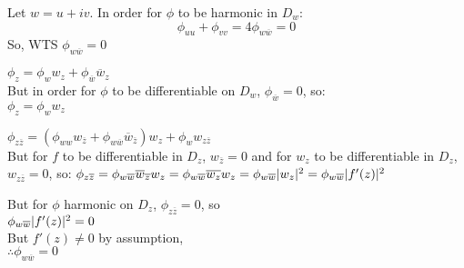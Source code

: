 \documentclass[letterpaper,12pt,fleqn]{article}
\newcommand{\p}{\phi}
\newcommand{\conj}[1]{\overline{#1}}
\newcommand{\wb}{\conj{w}}
\newcommand{\zb}{\conj{z}}
\begin{document}
\begin{theproof}
  Let $w=u+iv$. In order for $\p$ to be harmonic in $D_w$:
  \[\p_{uu}+\p_{vv}=4\p_{w\wb}=0\]
  So, WTS $\p_{w\wb}=0$

  $\p_z=\p_ww_z+\p_{\wb}\wb_z$ \\
  But in order for $\p$ to be differentiable on $D_w$, $\p_{\wb}=0$, so: \\
  $\p_z=\p_ww_z$

  $\p_{z\zb}=(\p_{ww}w_{\zb}+\p_{w\wb}\wb_{\zb})w_z+\p_ww_{z\zb}$ \\
  But for $f$ to be differentiable in $D_z$, $w_{\zb}=0$ and for $w_z$ to be
  differentiable in $D_z$, $w_{z\zb}=0$, so:
  $\p_{z\zb}=\p_{w\wb}\wb_{\zb}w_z=\p_{w\wb}\conj{w_z}w_z=\p_{w\wb}\abs{w_z}^2=
  \p_{w\wb}\abs{f'(z)}^2$

  But for $\p$ harmonic on $D_z$, $\p_{z\zb}=0$, so \\
  $\p_{w\wb}\abs{f'(z)}^2=0$ \\
  But $f'(z)\ne0$ by assumption, \\
  $\therefore\p_{w\wb}=0$
\end{theproof}
\end{document}
